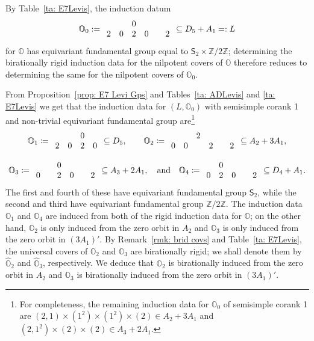 \documentclass[11pt]{amsart}
\renewcommand{\O}{{\mathbb O}}
\newcommand{\bZ}{{\mathbb Z}}
\newcommand{\Sym}{{\mathsf{S}}}
\newcommand{\hatO}{\widehat{\O}}
\numberwithin{equation}{section}
\begin{document}
By Table~\ref{ta: E7Levis}, the induction datum $$\O_0:=\begin{array}{c c c c c c}
		& & 0 & & & \\
		2 & 0 & 2 & 0 &  & 2 \\
	\end{array}\subseteq D_5+A_1=: L$$ for $\O$ has equivariant fundamental group equal to $\Sym_2\times\bZ/2\bZ$; determining the birationally rigid induction data for the nilpotent covers of $\O$ therefore reduces to determining the same for the nilpotent covers of $\O_0$. 
	
	From Proposition~\ref{prop: E7 Levi Gps} and Tables~\ref{ta: ADLevis} and \ref{ta: E7Levis} we get that the induction data for $(L,\O_0)$ with semisimple corank 1 and non-trivial equivariant fundamental group are\footnote{For completeness, the remaining induction data for $\O_0$ of semisimple corank 1 are $(2,1)\times(1^2)\times (1^2)\times (2)\in A_2+3A_1$ and $(2,1^2)\times (2)\times (2)\in A_3+2A_1$.} 	$$\O_1\coloneqq \begin{array}{c c c c}
		& & 0 &  \\
		2 & 0 & 2 & 0  \\
	\end{array}\subseteq D_5,\quad\quad \O_2\coloneqq \begin{array}{c c c c c c}
		& & 2 & & & \\
		0 & 0 & & 2 & & 2\\
	\end{array}\subseteq A_2 + 3 A_1, $$
	
	$$\O_3\coloneqq \begin{array}{c c c c c c}
		& & 0 & & & \\
		0 & & 2 & 0 & & 2\\
	\end{array}\subseteq  A_3 + 2 A_1,\quad\mbox{and}\quad \O_4\coloneqq \begin{array}{c c c c c}
		& 0 & & &  \\
		0 & 2 & 0 & & 2  \\
	\end{array}\subseteq D_4 + A_1.$$
	The first and fourth of these have equivariant fundamental group $\Sym_2$, while the second and third have equivariant fundamental group $\bZ/2\bZ$. The induction data $\O_1$ and $\O_4$ are induced from both of the rigid induction data for $\O$; on the other hand, $\O_2$ is only induced from the zero orbit in $A_2$ and $\O_3$ is only induced from the zero orbit in $(3 A_1)'$. By Remark~\ref{rmk: brid covs} and Table~\ref{ta: E7Levis}, the universal covers of $\O_2$ and $\O_3$ are birationally rigid; we shall denote them by $\hatO_2$ and $\hatO_3$, respectively. We deduce that $\O_2$ is birationally induced from the zero orbit in $A_2$ and $\O_3$ is birationally induced from the zero orbit in $(3 A_1)'$.
	
\end{document}
